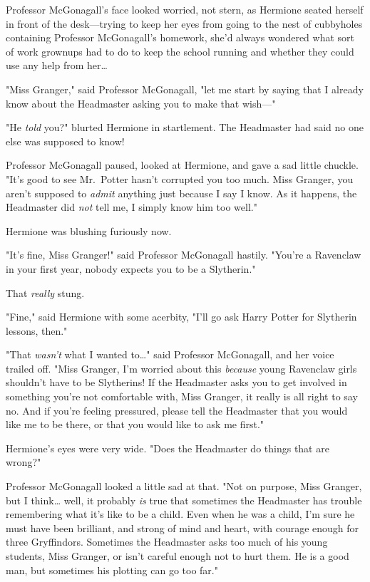 Professor McGonagall's face looked worried, not stern, as Hermione seated 
herself in front of the desk---trying to keep her eyes from going to the nest 
of cubbyholes containing Professor McGonagall's homework, she'd always wondered 
what sort of work grownups had to do to keep the school running and whether 
they could use any help from her{\ldots}

"Miss Granger," said Professor McGonagall, "let me start by saying that I 
already know about the Headmaster asking you to make that wish---"

"He \emph{told} you?" blurted Hermione in startlement. The Headmaster had said 
no one else was supposed to know!

Professor McGonagall paused, looked at Hermione, and gave a sad little chuckle. 
"It's good to see Mr.~Potter hasn't corrupted you too much. Miss Granger, you 
aren't supposed to \emph{admit} anything just because I say I know. As it 
happens, the Headmaster did \emph{not} tell me, I simply know him too well."

Hermione was blushing furiously now.

"It's fine, Miss Granger!" said Professor McGonagall hastily. "You're a 
Ravenclaw in your first year, nobody expects you to be a Slytherin."

That \emph{really} stung.

"Fine," said Hermione with some acerbity, "I'll go ask Harry Potter for 
Slytherin lessons, then."

"That \emph{wasn't} what I wanted to{\ldots}" said Professor McGonagall, and 
her voice trailed off. "Miss Granger, I'm worried about this \emph{because} 
young Ravenclaw girls shouldn't have to be Slytherins! If the Headmaster asks 
you to get involved in something you're not comfortable with, Miss Granger, it 
really is all right to say no. And if you're feeling pressured, please tell the 
Headmaster that you would like me to be there, or that you would like to ask me 
first."

Hermione's eyes were very wide. "Does the Headmaster do things that are wrong?"

Professor McGonagall looked a little sad at that. "Not on purpose, Miss 
Granger, but I think{\ldots} well, it probably \emph{is} true that sometimes 
the Headmaster has trouble remembering what it's like to be a child. Even when 
he was a child, I'm sure he must have been brilliant, and strong of mind and 
heart, with courage enough for three Gryffindors. Sometimes the Headmaster asks 
too much of his young students, Miss Granger, or isn't careful enough not to 
hurt them. He is a good man, but sometimes his plotting can go too far."

